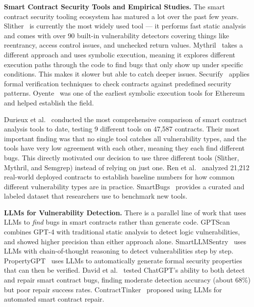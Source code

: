 \documentclass[11pt]{article}
\begin{document}
\textbf{Smart Contract Security Tools and Empirical Studies.}
The smart contract security tooling ecosystem has matured a lot over the past few years. Slither~\cite{slither} is currently the most widely used tool --- it performs fast static analysis and comes with over 90 built-in vulnerability detectors covering things like reentrancy, access control issues, and unchecked return values. Mythril~\cite{mythril} takes a different approach and uses symbolic execution, meaning it explores different execution paths through the code to find bugs that only show up under specific conditions. This makes it slower but able to catch deeper issues. Securify~\cite{securify} applies formal verification techniques to check contracts against predefined security patterns. Oyente~\cite{oyente} was one of the earliest symbolic execution tools for Ethereum and helped establish the field.

Durieux et al.~\cite{durieux2020empirical} conducted the most comprehensive comparison of smart contract analysis tools to date, testing 9 different tools on 47,587 contracts. Their most important finding was that no single tool catches all vulnerability types, and the tools have very low agreement with each other, meaning they each find different bugs. This directly motivated our decision to use three different tools (Slither, Mythril, and Semgrep) instead of relying on just one. Ren et al.~\cite{ren2021empirical} analyzed 21,212 real-world deployed contracts to establish baseline numbers for how common different vulnerability types are in practice. SmartBugs~\cite{smartbugs} provides a curated and labeled dataset that researchers use to benchmark new tools.

\textbf{LLMs for Vulnerability Detection.}
There is a parallel line of work that uses LLMs to \emph{find} bugs in smart contracts rather than generate code. GPTScan~\cite{gptscan} combines GPT-4 with traditional static analysis to detect logic vulnerabilities, and showed higher precision than either approach alone. SmartLLMSentry~\cite{smartllmsentry} uses LLMs with chain-of-thought reasoning to detect vulnerabilities step by step. PropertyGPT~\cite{propertygpt} uses LLMs to automatically generate formal security properties that can then be verified. David et al.~\cite{david2023you} tested ChatGPT's ability to both detect and repair smart contract bugs, finding moderate detection accuracy (about 68\%) but poor repair success rates. ContractTinker~\cite{contracttinker} proposed using LLMs for automated smart contract repair.
\end{document}
